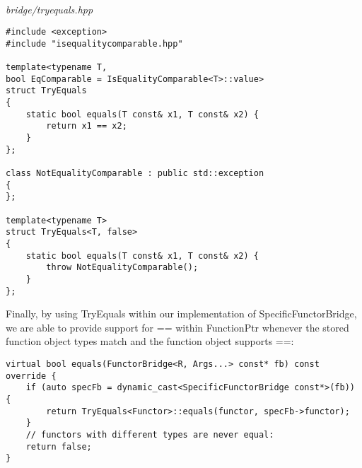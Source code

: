 \hspace*{\fill} \\ %
\noindent
\textit{bridge/tryequals.hpp}
\begin{lstlisting}[style=styleCXX]
#include <exception>
#include "isequalitycomparable.hpp"

template<typename T,
bool EqComparable = IsEqualityComparable<T>::value>
struct TryEquals
{
	static bool equals(T const& x1, T const& x2) {
		return x1 == x2;
	}
};

class NotEqualityComparable : public std::exception
{
};

template<typename T>
struct TryEquals<T, false>
{
	static bool equals(T const& x1, T const& x2) {
		throw NotEqualityComparable();
	}
};
\end{lstlisting}

Finally, by using TryEquals within our implementation of SpecificFunctorBridge, we are able to provide support for == within FunctionPtr whenever the stored function object types match and the function object supports ==:

\begin{lstlisting}[style=styleCXX]
virtual bool equals(FunctorBridge<R, Args...> const* fb) const override {
	if (auto specFb = dynamic_cast<SpecificFunctorBridge const*>(fb)) {
		return TryEquals<Functor>::equals(functor, specFb->functor);
	}
	// functors with different types are never equal:
	return false;
}
\end{lstlisting}




























